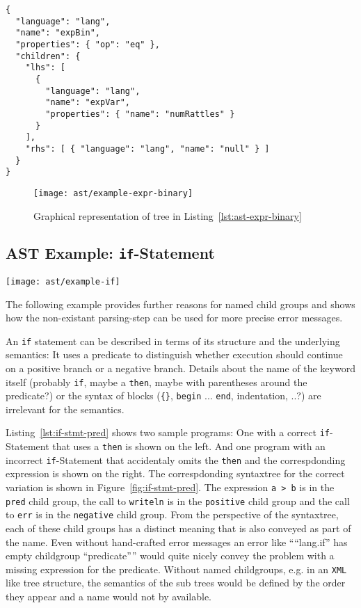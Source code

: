 \documentclass[sigconf,natbib=false]{acmart}
\newcommand{\enquote}[1]{``#1''}
\newcommand\astScale{0.7}
\begin{document}
\begin{lstlisting}[caption={AST for expression \texttt{numRattles == null}}, label=lst:ast-expr-binary]
{
  "language": "lang",
  "name": "expBin",
  "properties": { "op": "eq" },
  "children": {
    "lhs": [
      {
        "language": "lang",
        "name": "expVar",
        "properties": { "name": "numRattles" }
      }
    ],
    "rhs": [ { "language": "lang", "name": "null" } ]
  }
}
\end{lstlisting}

\begin{figure}
  \texttt{[image: ast/example-expr-binary]}
  \caption{Graphical representation of tree in Listing~\ref{lst:ast-expr-binary}}
  \label{fig:ast-expr-binary}
\end{figure}


\subsection{AST Example: \texttt{if}-Statement}
\label{sec:ast-example-if}

\begin{figure*}
  \texttt{[image: ast/example-if]}
  \caption{\texttt{if}-Statement with predicate}
  \label{fig:if-stmt-pred}
\end{figure*}

The following example provides further reasons for named child groups and shows how the non-existant parsing-step can be used for more precise error messages.

An \texttt{if} statement can be described in terms of its structure and the underlying semantics: It uses a predicate to distinguish whether execution should continue on a positive branch or a negative branch. Details about the name of the keyword itself (probably \texttt{if}, maybe a \texttt{then}, maybe with parentheses around the predicate?) or the syntax of blocks (\texttt{\{\}}, \texttt{begin} ... \texttt{end}, indentation, ..?) are irrelevant for the semantics.


Listing~\ref{lst:if-stmt-pred} shows two sample programs: One with a correct \texttt{if}-Statement that uses a \texttt{then} is shown on the left. And one program with an incorrect \texttt{if}-Statement that accidentaly omits the \texttt{then} and the correspdonding expression is shown on the right. The correspdonding syntaxtree for the correct variation is shown in Figure~\ref{fig:if-stmt-pred}. The expression \texttt{a > b} is in the \texttt{pred} child group, the call to \texttt{writeln} is in the \texttt{positive} child group and the call to \texttt{err} is in the \texttt{negative} child group. From the perspective of the syntaxtree, each of these child groups has a distinct meaning that is also conveyed as part of the name. Even without hand-crafted error messages an error like \enquote{\enquote{lang.if} has empty childgroup \enquote{predicate}} would quite nicely convey the problem with a missing expression for the predicate. Without named childgroups, e.g. in an \texttt{XML} like tree structure, the semantics of the sub trees would be defined by the order they appear and a name would not by available.
\end{document}

